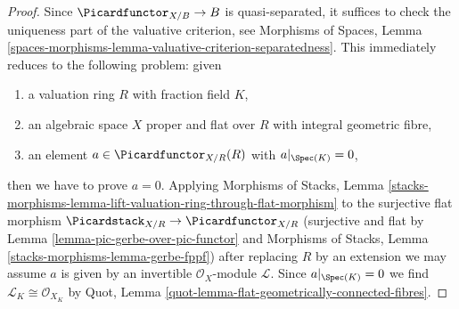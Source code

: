 \begin{proof}
Since $\Picardfunctor_{X/B} \to B$ is quasi-separated, it suffices
to check the uniqueness part of the valuative criterion, see
Morphisms of Spaces, Lemma
\ref{spaces-morphisms-lemma-valuative-criterion-separatedness}.
This immediately reduces to the following problem: given
\begin{enumerate}
\item a valuation ring $R$ with fraction field $K$,
\item an algebraic space $X$ proper and flat over $R$
with integral geometric fibre,
\item an element $a \in \Picardfunctor_{X/R}(R)$ with
$a|_{\Spec(K)} = 0$,
\end{enumerate}
then we have to prove $a = 0$. Applying
Morphisms of Stacks, Lemma
\ref{stacks-morphisms-lemma-lift-valuation-ring-through-flat-morphism}
to the surjective flat morphism
$\Picardstack_{X/R} \to \Picardfunctor_{X/R}$
(surjective and flat by Lemma \ref{lemma-pic-gerbe-over-pic-functor} and
Morphisms of Stacks, Lemma \ref{stacks-morphisms-lemma-gerbe-fppf})
after replacing $R$ by an extension we may assume
$a$ is given by an invertible $\mathcal{O}_X$-module
$\mathcal{L}$. Since $a|_{\Spec(K)} = 0$ we find
$\mathcal{L}_K \cong \mathcal{O}_{X_K}$ by
Quot, Lemma \ref{quot-lemma-flat-geometrically-connected-fibres}.


\end{proof}
